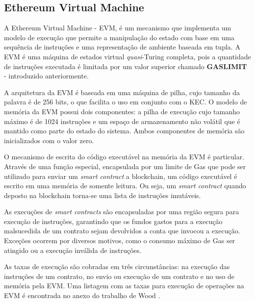 \documentclass[tcc,capa]{texufpel}
\begin{document}
    
	\subsection{Ethereum Virtual Machine}
	
	A Ethereum Virtual Machine - EVM, é um mecanismo que implementa um modelo de execução que permite a manipulação do estado com base em uma sequência de instruções e uma representação de ambiente baseada em tupla. A EVM é uma máquina de estados virtual \textit{quasi}-Turing completa, pois a quantidade de instruções executada é limitada por um valor superior chamado \textbf{GASLIMIT} - introduzido anteriormente.
	
	A arquitetura da EVM é baseada em uma máquina de pilha, cujo tamanho da palavra é de 256 bits, o que facilita o uso em conjunto com o KEC. O modelo de memória da EVM possui dois componentes: a pilha de execução cujo tamanho máximo é de 1024 instruções e um espaço de armazenamento não volátil que é mantido como parte do estado do sistema. Ambos componentes de memória são inicializados com o valor zero.
	
	O mecanismo de escrita do código executável na memória da EVM é particular. Através de uma função especial, encapsulada por um limite de Gas que pode ser utilizado para enviar um \textit{smart contract} a blockchain, um código executável é escrito em uma memória de somente leitura. Ou seja, um \textit{smart contract} quando deposto na blockchain torna-se uma lista de instruções imutáveis.
	
	As execuções de \textit{smart contracts} são encapsuladas por uma região segura para execução de instruções, garantindo que os fundos gastos para a execução malsucedida de um contrato sejam devolvidos a conta que invocou a execução. Exceções ocorrem por diversos motivos, como o consumo máximo de Gas ser atingido ou a execução inválida de instruções.
	
	As taxas de execução são cobradas em três circunstâncias: na execução das instruções de um contrato, no envio ou execução de um contrato e no uso de memória pela EVM. Uma listagem com as taxas para execução de operações na EVM é encontrada no anexo do trabalho de Wood \cite{wood2014ethereum}.
  
    
\end{document}
